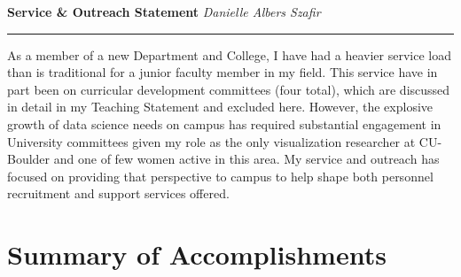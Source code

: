 \documentclass[11pt]{article}
\begin{document}
\setlength{\belowcaptionskip}{-10pt}

\thispagestyle{fancy}

\textbf{\Large Service \& Outreach Statement}
{\hspace{145pt}\emph{Danielle Albers Szafir} \vspace{3pt}}
\hrule

As a member of a new Department and College, I have had a heavier service load than is traditional for a junior faculty member in my field. This service have in part been on curricular development committees (four total), which are discussed in detail in my Teaching Statement and excluded here. However, the explosive growth of data science needs on campus has required substantial engagement in University committees given my role as the only visualization researcher at CU-Boulder and one of few women active in this area. My service and outreach has focused on providing that perspective to campus to help shape both personnel recruitment and support services offered. 


\section*{Summary of Accomplishments}
\end{document}
